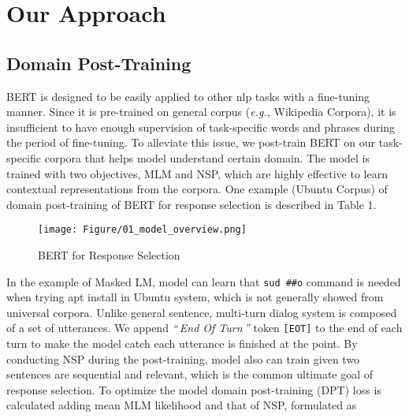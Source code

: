 \documentclass[a4paper]{article}
\begin{document}
 \section{Our Approach}
\subsection{Domain Post-Training}
\label{ssec:bert-dpt}
BERT is designed to be easily applied to other nlp tasks with a fine-tuning manner. Since it is pre-trained on general corpus ({\em{e.g.,}} Wikipedia Corpora), it is insufficient to have enough supervision of task-specific words and phrases during the period of fine-tuning. To alleviate this issue, we post-train BERT on our task-specific corpora that helps model understand certain domain. The model is trained with two objectives, MLM and NSP, which are highly effective to learn contextual representations from the corpora. One example (Ubuntu Corpus) of domain post-training of BERT for response selection is described in Table 1.

\begin{figure}[t]\centering
\texttt{[image: Figure/01\_model\_overview.png]}
\caption{BERT for Response Selection}
\label{fig:bert_response_selection}
\vspace{-0.3cm}
\end{figure}

In the example of Masked LM, model can learn that {\verb|sud|}\, {\verb|##o|} command is needed when trying apt install in Ubuntu system, which is not generally showed from universal corpora. Unlike general sentence, multi-turn dialog system is composed of a set of utterances. We append \textit{``\,End Of Turn\,''} token \normalsize{\verb|[EOT]|} to the end of each turn to make the model catch each utterance is finished at the point. By conducting NSP during the post-training, model also can train given two sentences are sequential and relevant, which is the common ultimate goal of response selection.
To optimize the model domain post-training (DPT) loss is calculated adding mean MLM likelihood and that of NSP, formulated as 
\end{document}
